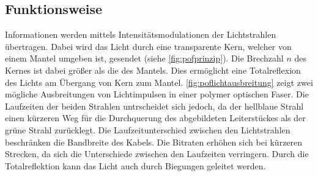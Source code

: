 \subsection{Funktionsweise}
\label{subsec:poffunktionsweise}

Informationen werden mittels Intensitätsmodulationen der Lichtstrahlen
übertragen. Dabei wird das Licht durch eine transparente Kern, welcher von einem
Mantel umgeben ist, gesendet (siehe \autoref{fig:pofprinzip}). Die Brechzahl $n$
des Kernes ist dabei größer als die des Mantels. Dies ermöglicht eine
Totalreflexion des Lichts am Übergang von Kern zum Mantel.
\autoref{fig:poflichtausbreitung} zeigt zwei mögliche Ausbreitungen von
Lichtimpulsen in einer polymer optischen Faser. Die Laufzeiten der beiden
Strahlen untrscheidet sich jedoch, da der hellblaue Strahl einen kürzeren Weg
für die Durchquerung des abgebildeten Leiterstückes als der grüne Strahl
zurücklegt. Die Laufzeitunterschied zwischen den Lichtstrahlen beschränken die
Bandbreite des Kabels. Die Bitraten erhöhen sich bei kürzeren Strecken, da sich
die Unterschiede zwischen den Laufzeiten verringern. Durch die Totalreflektion
kann das Licht auch durch Biegungen geleitet werden. \cite{pofacprinzip}



